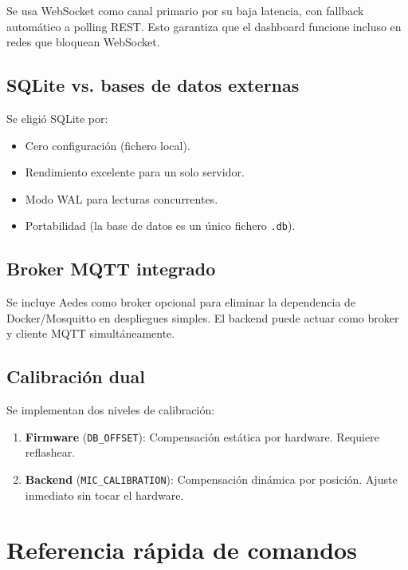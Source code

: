 \documentclass[12pt,a4paper]{report}
\begin{document}
Se usa WebSocket como canal primario por su baja latencia, con fallback autom\'atico a polling REST. Esto garantiza que el dashboard funcione incluso en redes que bloquean WebSocket.

\section{SQLite vs. bases de datos externas}

Se eligi\'o SQLite por:
\begin{itemize}
    \item Cero configuraci\'on (fichero local).
    \item Rendimiento excelente para un solo servidor.
    \item Modo WAL para lecturas concurrentes.
    \item Portabilidad (la base de datos es un \'unico fichero \texttt{.db}).
\end{itemize}

\section{Broker MQTT integrado}

Se incluye Aedes como broker opcional para eliminar la dependencia de Docker/Mosquitto en despliegues simples. El backend puede actuar como broker y cliente MQTT simult\'aneamente.

\section{Calibraci\'on dual}

Se implementan dos niveles de calibraci\'on:
\begin{enumerate}
    \item \textbf{Firmware} (\texttt{DB\_OFFSET}): Compensaci\'on est\'atica por hardware. Requiere reflashear.
    \item \textbf{Backend} (\texttt{MIC\_CALIBRATION}): Compensaci\'on din\'amica por posici\'on. Ajuste inmediato sin tocar el hardware.
\end{enumerate}

\appendix

\chapter{Referencia r\'apida de comandos}
\end{document}
